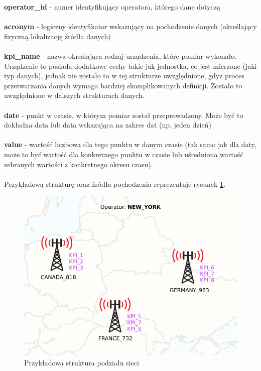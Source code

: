 \documentclass[eng,printmode]{mgr}
\begin{document}
\noindent \textbf{operator\_id} - numer identyfikujący operatora, którego dane dotyczą
\\\\
\textbf{acronym} - logiczny identyfikator wskazujący na pochodzenie danych (określający fizyczną lokalizację źródła danych)
\\\\
\textbf{kpi\_name} - nazwa określająca rodzaj urządzenia, które pomiar wykonało. Urządzenie to posiada dodatkowe cechy takie jak jednostka, co jest mierzone (jaki typ danych), jednak nie zostało to w tej strukturze uwzględnione, gdyż proces przetwarzania danych wymaga bardziej skomplikowanych definicji. Zostało to uwzględnione w dalszych strukturach danych.
\\\\
\textbf{date} - punkt w czasie, w którym pomiar został przeprowadzony. Może być to dokładna data lub data wskazująca na zakres dat (np. jeden dzień)
\\\\
\textbf{value} - wartość liczbowa dla tego punktu w danym czasie (tak samo jak dla daty, może to być wartość dla konkretnego punktu w czasie lub uśredniona wartość zebranych wartości z konkretnego okresu czasu).
\\ \\
Przykładową strukturę oraz źródła pochodzenia reprezentuje rysunek \ref{fig:struct}.
\begin{figure}[H]
\includegraphics[scale=0.6]{struct}
\caption{Przykładowa struktura podziału sieci}
\label{fig:struct}
\end{figure}
\end{document}
